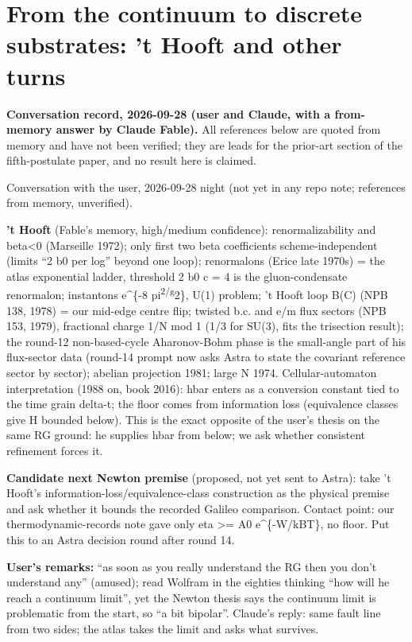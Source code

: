 \documentclass[11pt,a4paper]{article}
\begin{document}
\hypertarget{from-the-continuum-to-discrete-substrates-t-hooft-and-other-turns}{%
\section{From the continuum to discrete substrates: 't Hooft and other
turns}\label{from-the-continuum-to-discrete-substrates-t-hooft-and-other-turns}}

\textbf{Conversation record, 2026-09-28 (user and Claude, with a
from-memory answer by Claude Fable).} All references below are quoted
from memory and have not been verified; they are leads for the prior-art
section of the fifth-postulate paper, and no result here is claimed.

Conversation with the user, 2026-09-28 night (not yet in any repo note;
references from memory, unverified).

\textbf{'t Hooft} (Fable's memory, high/medium confidence):
renormalizability and beta\textless0 (Marseille 1972); only first two
beta coefficients scheme-independent (limits ``2 b0 per log'' beyond one
loop); renormalons (Erice late 1970s) = the atlas exponential ladder,
threshold 2 b0 c = 4 is the gluon-condensate renormalon; instantons
e\^{}\{-8 pi\textsuperscript{2/g}2\}, U(1) problem; 't Hooft loop B(C)
(NPB 138, 1978) = our mid-edge centre flip; twisted b.c. and e/m flux
sectors (NPB 153, 1979), fractional charge 1/N mod 1 (1/3 for SU(3),
fits the trisection result); the round-12 non-based-cycle Aharonov-Bohm
phase is the small-angle part of his flux-sector data (round-14 prompt
now asks Astra to state the covariant reference sector by sector);
abelian projection 1981; large N 1974. Cellular-automaton interpretation
(1988 on, book 2016): hbar enters as a conversion constant tied to the
time grain delta-t; the floor comes from information loss (equivalence
classes give H bounded below). This is the exact opposite of the user's
thesis on the same RG ground: he supplies hbar from below; we ask
whether consistent refinement forces it.

\textbf{Candidate next Newton premise} (proposed, not yet sent to
Astra): take 't Hooft's information-loss/equivalence-class construction
as the physical premise and ask whether it bounds the recorded Galileo
comparison. Contact point: our thermodynamic-records note gave only eta
\textgreater= A0 e\^{}\{-W/kBT\}, no floor. Put this to an Astra
decision round after round 14.

\textbf{User's remarks:} ``as soon as you really understand the RG then
you don't understand any'' (amused); read Wolfram in the eighties
thinking ``how will he reach a continuum limit'', yet the Newton thesis
says the continuum limit is problematic from the start, so ``a bit
bipolar''. Claude's reply: same fault line from two sides; the atlas
takes the limit and asks what survives.
\end{document}
